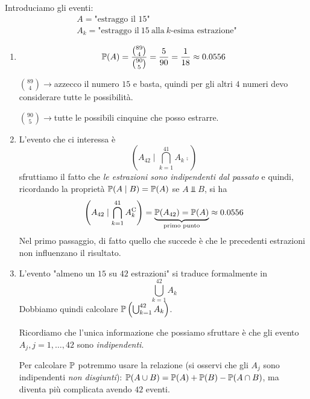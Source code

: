 Introduciamo gli eventi:
\begin{gather*}
	A=\text{"estraggo il 15"}\\
	A_{k} =\text{"estraggo il} \ 15\ \text{alla} \ k\text{-esima estrazione"}
\end{gather*}
\begin{enumerate}
	\item
	\begin{equation*}
		\mathbb{P}( A) =\frac{\binom{89}{4}}{\binom{90}{5}} =\frac{5}{90} =\frac{1}{18} \approx 0.0556
	\end{equation*}

	$\binom{89}{4}\rightarrow $azzecco il numero $15$ e basta, quindi per gli altri $4$ numeri devo considerare tutte le possibilità.

	$\binom{90}{5}\rightarrow $tutte le possibili cinquine che posso estrarre.
	\item L'evento che ci interessa è
	\begin{equation*}
		\left( A_{42} \mid \bigcap _{k=1}^{41} A_{k}\comp\right)
	\end{equation*}
	sfruttiamo il fatto che \textit{le estrazioni sono indipendenti dal passato} e quindi, ricordando la proprietà $\mathbb{P}( A\mid B) =\mathbb{P}( A)$ se $A\Bot B$, si ha
	\begin{equation*}
		\left( A_{42} \mid\bigcap _{k=1}^{41} A_{k}^{\mathrm{C}}\right) =\underbrace{\mathbb{P}( A_{42}) =\mathbb{P}( A)}_{\text{primo punto}} \approx 0.0556
	\end{equation*}
	Nel primo passaggio, di fatto quello che succede è che le precedenti estrazioni non influenzano il risultato.
	\item L'evento "almeno un $15$ su $42$ estrazioni" si traduce formalmente in
	\begin{equation*}
		\bigcup _{k=1}^{42} A_{k}
	\end{equation*}
	Dobbiamo quindi calcolare $\mathbb{P}\left(\bigcup _{k=1}^{42} A_{k}\right)$.

	Ricordiamo che l'unica informazione che possiamo sfruttare è che gli evento $A_{j} ,j=1,\dots,42$ sono \textit{indipendenti}.

	Per calcolare $\mathbb{P}$ potremmo usare la relazione (si osservi che gli $A_{j}$ sono indipendenti \textit{non disgiunti}): $\mathbb{P}( A\cup B) =\mathbb{P}( A) +\mathbb{P}( B) -\mathbb{P}( A\cap B)$, ma diventa più complicata avendo $42$ eventi.


\end{enumerate}
